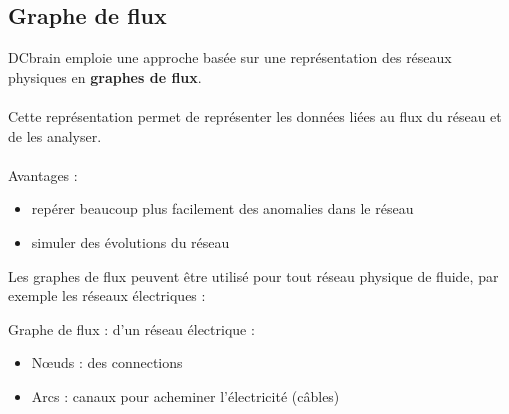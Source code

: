 	\subsection{Graphe de flux}
	\begin{frame}
		DCbrain emploie une approche basée sur une représentation des réseaux physiques en \textbf{graphes de flux}.
		\\~\\
		\pause
		Cette représentation permet de représenter les données liées au flux du réseau et de les analyser.
		\\~\\
		\pause
		Avantages :
		\begin{itemize}
		\pause
		\item repérer beaucoup plus facilement des anomalies dans le réseau
		\pause
		\item simuler des évolutions du réseau
		\end{itemize}
	\end{frame}
	\begin{frame}
		Les graphes de flux peuvent être utilisé pour tout réseau physique de fluide, par exemple les réseaux électriques :
		\pause
		\begin{exampleblock}{Graphe de flux : d'un réseau électrique :}
		\begin{itemize}
		\item Nœuds : des connections
		\item Arcs : canaux pour acheminer l'électricité (câbles)
		\end{itemize}
		\end{exampleblock}
	\end{frame}	
	

